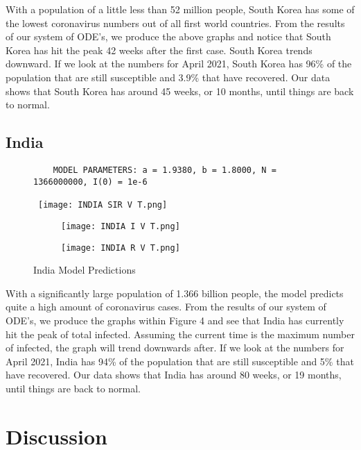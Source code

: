 \documentclass[a4paper,10pt]{article}
\begin{document}
With a population of a little less than 52 million people, South Korea has some of the lowest coronavirus numbers out of all first world countries. From the results of our system of ODE's, we produce the above graphs and notice that South Korea has hit the peak 42 weeks after the first case. South Korea trends downward. If we look at the numbers for  April 2021, South Korea  has 96\% of the population that are still susceptible and 3.9\% that have recovered. Our data shows that South Korea has around 45 weeks, or 10 months, until things are back to normal.
\newpage
\clearpage
\subsection{India}

\begin{figure}[!htb]
\centering
\begin{verbatim}
    MODEL PARAMETERS: a = 1.9380, b = 1.8000, N = 1366000000, I(0) = 1e-6
\end{verbatim}\
\texttt{[image: INDIA SIR V T.png]}
\begin{subfigure}{.5\textwidth}
  \centering
  \texttt{[image: INDIA I V T.png]}
  \label{fig:india1}
\end{subfigure}%
\begin{subfigure}{.5\textwidth}
  \centering
  \texttt{[image: INDIA R V T.png]}
  \label{fig:india2}
\end{subfigure}
\caption{India Model Predictions}
\label{fig:india}
\end{figure}
\FloatBarrier

With a significantly large population of 1.366 billion people, the model predicts quite a high amount of coronavirus cases. From the results of our system of ODE's, we produce the graphs within Figure 4 and see that India has currently hit the peak of total infected. Assuming the current time is the maximum number of infected, the graph will trend downwards after. If we look at the numbers for  April 2021, India  has 94\% of the population that are still susceptible and 5\% that have recovered. Our data shows that India has around 80 weeks, or 19 months, until things are back to normal.
\newpage
\clearpage

\section{Discussion}
\end{document}
